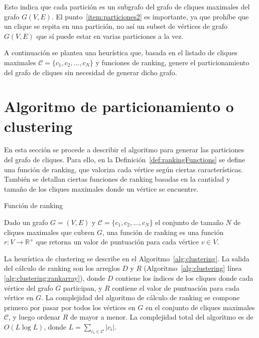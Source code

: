 Esto indica que cada partición es un subgrafo del grafo de cliques maximales del grafo $G(V,E)$. El punto~\ref{item:particiones2} es importante, ya que prohíbe que un clique se repita en una partición, no así un subset de vértices de grafo $G(V,E)$ que sí puede estar en varias particiones a la vez.


A continuación se plantea una heurística que, basada en el listado de cliques maximales $\mathcal{C} = \{c_{1}, c_{2}, ..., c_{N} \}$ y funciones de ranking, genere el particionamiento del grafo de cliques sin necesidad de generar dicho grafo.


\section{Algoritmo de particionamiento o clustering} \label{sec:PartitionAlgoritms}

En esta sección se procede a describir el algoritmo para generar las particiones del grafo de cliques. Para ello, en la Definición~\ref{def:rankingFunctions} se define una función de ranking, que valoriza cada vértice según ciertas características. También se detallan ciertas funciones de ranking basadas en la cantidad y tamaño de los cliques maximales donde un vértice se encuentre.

\begin{definition} 
	\label{def:rankingFunctions}
	Función de ranking
	
	Dado un grafo $G = (V, E)$ y $\mathcal{C} = \{c_{1}, c_{2}, ..., c_{N} \}$ el conjunto de tamaño $N$ de cliques maximales que cubren $G$, una función de ranking es una función $r: V \rightarrow \mathbb{R}^{+}$ que retorna un valor de puntuación para cada vértice $v \in V$.
\end{definition}

La heurística de clustering se describe en el Algoritmo~\ref{alg:clustering}. La salida del cálculo de ranking son los arreglos $D$ y $R$ (Algoritmo~\ref{alg:clustering} línea \ref{alg:clustering:rankarray}), donde $D$ contiene los índices de los cliques donde cada vértice del grafo $G$ participan, y $R$ contiene el valor de puntuación para cada vértice en $G$. La complejidad del algoritmo de cálculo de ranking se compone primero por pasar por todos los vértices en $G$ en el conjunto de cliques maximales $\mathcal{C}$, y luego ordenar $R$ de mayor a menor. La complejidad total del algoritmo es de $O(L \log L)$, donde $L=\sum_{c_i \in \mathcal{C}}|c_{i}|$.

